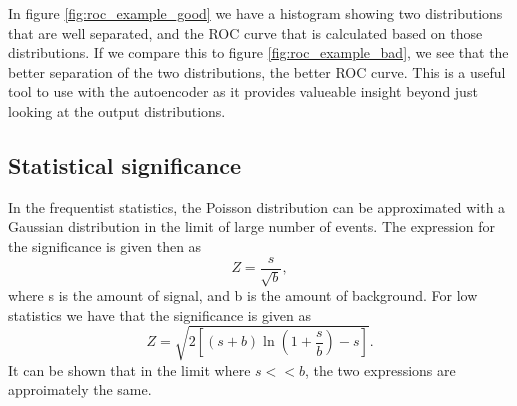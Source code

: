 In figure \ref{fig:roc_example_good} we have a histogram showing two distributions that are well separated, and the ROC curve that is calculated 
based on those distributions. If we compare this to figure \ref{fig:roc_example_bad}, we see that the better separation of the two distributions, the better ROC curve. 
This is a useful tool to use with the autoencoder as it provides valueable insight beyond just looking at the output distributions. 

\subsection*{Statistical significance}
In the frequentist statistics, the Poisson distribution can be approximated with a Gaussian distribution in the limit of large number of events\cite{magnar}. 
The expression for the significance is given then as 
\begin{equation}\label{eq:significance_large}
    Z = \frac{s}{\sqrt{b}},
\end{equation}
where s is the amount of signal, and b is the amount of background. For low statistics we have that the significance is given as 
\begin{equation}\label{eq:significance_small}
    Z = \sqrt{2\left[(s+b)\ln(1+\frac{s}{b})-s\right]}.
\end{equation}
It can be shown that in the limit where $s << b$, the two expressions are approimately the same\cite{magnar}.

